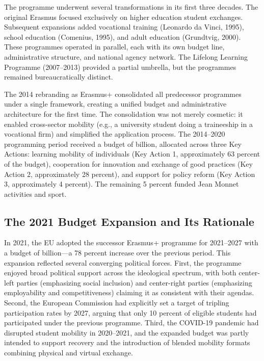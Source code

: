 \documentclass[12pt]{article}
\begin{document}
The programme underwent several transformations in its first three decades. The original Erasmus focused exclusively on higher education student exchanges. Subsequent expansions added vocational training (Leonardo da Vinci, 1995), school education (Comenius, 1995), and adult education (Grundtvig, 2000). These programmes operated in parallel, each with its own budget line, administrative structure, and national agency network. The Lifelong Learning Programme (2007--2013) provided a partial umbrella, but the programmes remained bureaucratically distinct.

The 2014 rebranding as Erasmus+ consolidated all predecessor programmes under a single framework, creating a unified budget and administrative architecture for the first time. The consolidation was not merely cosmetic: it enabled cross-sector mobility (e.g., a university student doing a traineeship in a vocational firm) and simplified the application process. The 2014--2020 programming period received a budget of  billion, allocated across three Key Actions: learning mobility of individuals (Key Action 1, approximately 63 percent of the budget), cooperation for innovation and exchange of good practices (Key Action 2, approximately 28 percent), and support for policy reform (Key Action 3, approximately 4 percent). The remaining 5 percent funded Jean Monnet activities and sport.

\subsection{The 2021 Budget Expansion and Its Rationale}

In 2021, the EU adopted the successor Erasmus+ programme for 2021--2027 with a budget of  billion---a 78 percent increase over the previous period. This expansion reflected several converging political forces. First, the programme enjoyed broad political support across the ideological spectrum, with both center-left parties (emphasizing social inclusion) and center-right parties (emphasizing employability and competitiveness) claiming it as consistent with their agendas. Second, the European Commission had explicitly set a target of tripling participation rates by 2027, arguing that only 10 percent of eligible students had participated under the previous programme. Third, the COVID-19 pandemic had disrupted student mobility in 2020--2021, and the expanded budget was partly intended to support recovery and the introduction of blended mobility formats combining physical and virtual exchange.
\end{document}
